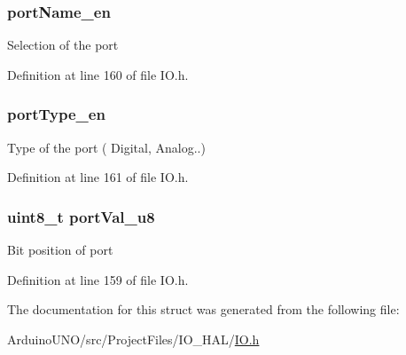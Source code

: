 \subsubsection[{port\+Name\+\_\+en}]{ port\+Name\+\_\+en}\label{structport__types__struct_a72057821dac134dc8a87b799141e7d91}
Selection of the port 

Definition at line 160 of file I\+O.\+h.

\hypertarget{structport__types__struct_a8e103fbfee17cee6bdb7a2831d4ba138}{}
\subsubsection[{port\+Type\+\_\+en}]{ port\+Type\+\_\+en}\label{structport__types__struct_a8e103fbfee17cee6bdb7a2831d4ba138}
Type of the port ( Digital, Analog..) 

Definition at line 161 of file I\+O.\+h.

\hypertarget{structport__types__struct_a615d0b42ed9d6a5cdddaf76af96a1215}{}
\subsubsection[{port\+Val\+\_\+u8}]{\setlength{\rightskip}{0pt plus 5cm}uint8\+\_\+t port\+Val\+\_\+u8}\label{structport__types__struct_a615d0b42ed9d6a5cdddaf76af96a1215}
Bit position of port 

Definition at line 159 of file I\+O.\+h.



The documentation for this struct was generated from the following file\+:\begin{DoxyCompactItemize}
\item 
Arduino\+U\+N\+O/src/\+Project\+Files/\+I\+O\+\_\+\+H\+A\+L/\hyperlink{_i_o_8h}{I\+O.\+h}\end{DoxyCompactItemize}
